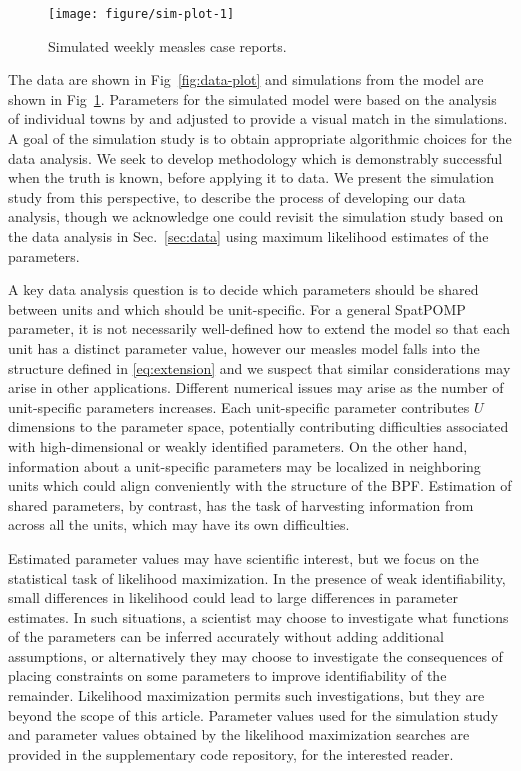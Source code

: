 \documentclass[12pt]{article}\usepackage[]{graphicx}\usepackage[]{xcolor}
\newenvironment{knitrout}{}{} %
\begin{document}
\begin{knitrout}
\color{fgcolor}\begin{figure}

\texttt{[image: figure/sim-plot-1]} \hfill{}

\caption[Simulated weekly measles case reports]{Simulated weekly measles case reports.}\label{fig:sim-plot}
\end{figure}

\end{knitrout}

The data are shown in Fig~\ref{fig:data-plot} and simulations from the model are shown in Fig~\ref{fig:sim-plot}.
Parameters for the simulated model were based on the analysis of individual towns by \citet{he10} and adjusted to provide a visual match in the simulations.
A goal of the simulation study is to obtain appropriate algorithmic choices for the data analysis.
We seek to develop methodology which is demonstrably successful when the truth is known, before applying it to data.
We present the simulation study from this perspective, to describe the process of developing our data analysis, though we acknowledge one could revisit the simulation study based on the data analysis in Sec.~\ref{sec:data} using maximum likelihood estimates of the parameters.

A key data analysis question is to decide which parameters should be shared between units and which should be unit-specific.
For a general SpatPOMP parameter, it is not necessarily well-defined how to extend the model so that each unit has a distinct parameter value, however our measles model falls into the structure defined in \eqref{eq:extension} and we suspect that similar considerations may arise in other applications.
Different numerical issues may arise as the number of unit-specific parameters increases.
Each unit-specific parameter contributes $U$ dimensions to the parameter space, potentially contributing difficulties associated with high-dimensional or weakly identified parameters.
On the other hand, information about a unit-specific parameters may be localized in neighboring units which could align conveniently with the structure of the BPF.
Estimation of shared parameters, by contrast, has the task of harvesting information from across all the units, which may have its own difficulties.

Estimated parameter values may have scientific interest, but we focus on the statistical task of likelihood maximization.
In the presence of weak identifiability, small differences in likelihood could lead to large differences in parameter estimates.
In such situations, a scientist may choose to investigate what functions of the parameters can be inferred accurately without adding additional assumptions, or alternatively they may choose to investigate the consequences of placing constraints on some parameters to improve identifiability of the remainder.
Likelihood maximization permits such investigations, but they are beyond the scope of this article.
Parameter values used for the simulation study and parameter values obtained by the likelihood maximization searches are provided in the supplementary code repository, for the interested reader.
\end{document}
